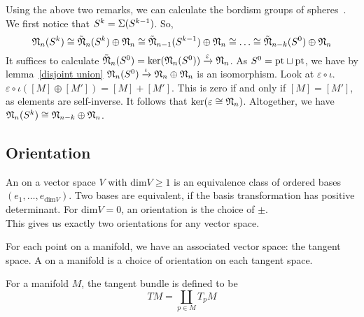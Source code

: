 \documentclass[a4paper,11pt]{article}
\begin{document}
Using the above two remarks, we can calculate the bordism groups of spheres\ \cite[Proposition 6.1]{zhang}. We first notice that \(S^k=\Sigma(S^{k-1})\). So,
\[\mathfrak{N}_n(S^k)\cong\tilde{\mathfrak{N}}_n(S^k)\oplus\mathfrak{N}_n\cong\tilde{\mathfrak{N}}_{n-1}(S^{k-1})\oplus\mathfrak{N}_n\cong\dots\cong\tilde{\mathfrak{N}}_{n-k}(S^0)\oplus\mathfrak{N}_n\]
It suffices to calculate \(\tilde{\mathfrak{N}}_n(S^0)=\ker(\mathfrak{N}_n(S^0))\xrightarrow{\varepsilon}\mathfrak{N}_n\). As \(S^0=\mathrm{pt}\sqcup\mathrm{pt}\), we have by lemma\ \ref{disjoint union} \(\mathfrak{N}_n(S^0)\xrightarrow{\iota}\mathfrak{N}_n\oplus\mathfrak{N}_n\) is an isomorphism. 
Look at \(\varepsilon\circ\iota\). \(\varepsilon\circ\iota([M]\oplus[M'])=[M]+[M']\). This is zero if and only if \([M]=[M']\), as elements are self-inverse. It follows that \(\ker(\varepsilon\cong\mathfrak{N}_n)\). 
Altogether, we have \(\mathfrak{N}_n(S^k)\cong\mathfrak{N}_{n-k}\oplus\mathfrak{N}_n\).

\subsection{Orientation}


\begin{definition}
    An  on a vector space \(V\) with \(\mathrm{dim} V\geq 1\) is an equivalence class of ordered bases \((e_1,\dots,e_{\mathrm{dim}V})\). Two bases are equivalent, if the basis transformation has positive determinant. For \(\mathrm{dim}V=0\), an orientation is the choice of \(\pm\).\\
    This gives us exactly two orientations for any vector space.
\end{definition}

\begin{definition}
    For each point on a manifold, we have an associated vector space: the tangent space. A  on a manifold is a choice of orientation on each tangent space.
\end{definition}

\begin{definition}
    For a manifold \(M\), the tangent bundle is defined to be \[TM=\coprod_{p\in M} T_p M\]
\end{definition}
\end{document}
